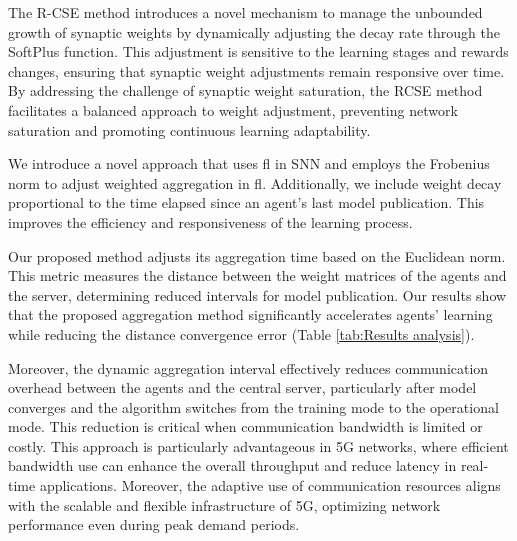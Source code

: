 The R-CSE method introduces a novel mechanism to manage the unbounded growth of synaptic weights by dynamically adjusting the decay rate through the SoftPlus function. This adjustment is sensitive to the learning stages and rewards changes, ensuring that synaptic weight adjustments remain responsive over time. By addressing the challenge of synaptic weight saturation, the \ac{RCSE} method facilitates a balanced approach to weight adjustment, preventing network saturation and promoting continuous learning adaptability.

We introduce a novel approach that uses \ac{fl} in SNN and employs the Frobenius norm to adjust weighted aggregation in \ac{fl}. Additionally, we include weight decay proportional to the time elapsed since an agent's last model publication. This improves the efficiency and responsiveness of the learning process.

Our proposed method adjusts its aggregation time based on the Euclidean norm. This metric measures the distance between the weight matrices of the agents and the server, determining reduced intervals for model publication. Our results show that the proposed aggregation method significantly accelerates agents' learning while reducing the distance convergence error (Table \ref{tab:Results analysis}).

Moreover, the dynamic aggregation interval effectively reduces communication overhead between the agents and the central server, particularly after model converges and the algorithm switches from the training mode to the operational mode. This reduction is critical when communication bandwidth is limited or costly. This approach is particularly advantageous in 5G networks, where efficient bandwidth use can enhance the overall throughput and reduce latency in real-time applications. Moreover, the adaptive use of communication resources aligns with the scalable and flexible infrastructure of 5G, optimizing network performance even during peak demand periods.